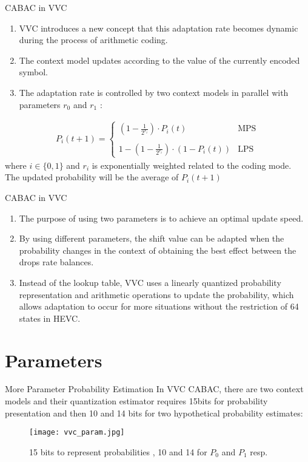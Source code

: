 \documentclass{beamer}
\providecommand{\brak}[1]{\ensuremath{\left(#1\right)}}
\begin{document}
\begin{frame}{CABAC in VVC}
\begin{enumerate}[]
    \item VVC introduces a new concept that this adaptation rate becomes dynamic during the process of arithmetic coding.
    \item The context model updates according to the value of the currently encoded symbol.
    \item The adaptation rate is controlled by two context models in parallel with parameters $r_0$ and $r_1$ :
\end{enumerate}

\begin{align}
    P_i(t+1) =\label{vvc_1}
    \begin{cases}
        \brak{1-\frac{1}{2^{r_i}}}\cdot P_i(t)&\text{MPS}\\\\
        1-\brak{1-\frac{1}{2^{r_i}}}\cdot(1-P_i(t))&\text{LPS}
    \end{cases}
\end{align}
where $i \in \{0,1\}$ and $r_i$ is exponentially weighted related to the coding mode.\\
The updated probability will be the average of $P_i(t+1)$ 
\end{frame}
\begin{frame}{CABAC in VVC}
\begin{enumerate}
\item The purpose of using two parameters is to achieve an optimal update speed.
\item By using different parameters, the shift value can be adapted when the probability changes in the context of obtaining the best effect between the drops rate balances.
\item Instead of the lookup table, VVC uses a linearly quantized probability representation and arithmetic operations to update the probability, which allows adaptation to occur for more situations without the restriction of 64 states in HEVC.
\end{enumerate}
\end{frame}
\section{Parameters}
\begin{frame}{More Parameter Probability Estimation}
In VVC CABAC, there are two context models and their quantization estimator requires 15bits for probability presentation and then 10 and 14 bits for two hypothetical probability estimates:
\begin{figure}[h]
    \centering
    \texttt{[image: vvc\_param.jpg]}
    \caption{15 bits to represent probabilities , 10 and 14 for $P_0$ and $P_1$ resp.}
    \label{fig:original_vvc}
\end{figure}

\end{frame}
\end{document}
